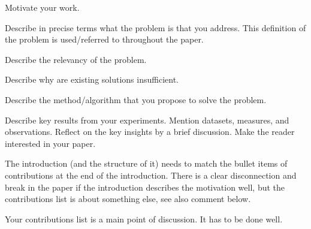 \documentclass[sigconf, nonacm]{acmart}
\begin{document}



Motivate your work.



Describe in precise terms what the problem is that you address. 
This definition of the problem is used/referred to throughout the paper.


Describe the relevancy of the problem. 


Describe why are existing solutions insufficient.



Describe the method/algorithm that you propose to solve the problem.


Describe key results from your experiments. 
Mention datasets, measures, and observations.
Reflect on the key insights by a brief discussion.
Make the reader interested in your paper.


\begin{tcolorbox}[title=Instruction: Write down your list of contributions.]
The introduction (and the structure of it) needs to match the bullet items of contributions at the end of the introduction. There is a clear disconnection and break in the paper if the introduction describes the motivation well, but the contributions list is about something else, see also comment below. 

Your contributions list is a main point of discussion. 
It has to be done well. 
\end{tcolorbox}
\end{document}
